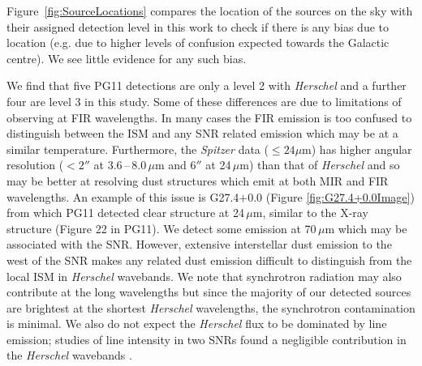 \documentclass[fleqn,usenatbib]{mnras}
\begin{document}
{Figure~\ref{fig:SourceLocations} compares the location of the sources on the sky with their assigned detection level in this work to check if there is any bias due to location (e.g. due to higher levels of confusion expected towards the Galactic centre).  We see little evidence for any such bias.

We find that five PG11 detections are only a level 2 with \textit{Herschel} and a further four are level 3 in this study. Some of these differences are due to limitations of observing at FIR wavelengths.
In many cases the FIR emission is too confused to distinguish between the ISM and any SNR related emission which may be at a similar temperature. Furthermore, the \textit{Spitzer} data ($\leq 24 \mu$m) has higher angular resolution ($< 2''$ at 3.6\,--\,8.0\,$\mu$m and $6''$ at 24\,$\mu$m) than that of \textit{Herschel} and so may be better at resolving dust structures which emit at both MIR and FIR wavelengths. An example of this issue is G27.4$+$0.0 (Figure \ref{fig:G27.4+0.0Image}) from which PG11 detected clear structure at 24\,$\mu$m, similar to the X-ray structure (Figure 22 in PG11).
We detect some emission at 70\,$\mu$m which may be associated with the SNR. However, extensive interstellar dust emission to the west of the SNR makes any related dust emission difficult to distinguish from the local ISM in \textit{Herschel} wavebands.
We note that synchrotron radiation may also contribute at the long wavelengths but since the majority of our detected sources are brightest at the shortest \textit{Herschel} wavelengths, the synchrotron contamination is minimal. We also do not expect the \textit{Herschel} flux to be dominated by line emission; studies of line intensity in two SNRs found a negligible contribution in the \textit{Herschel} wavebands \citep{Gomez2012b, DeLooze2017}.


}
\end{document}
